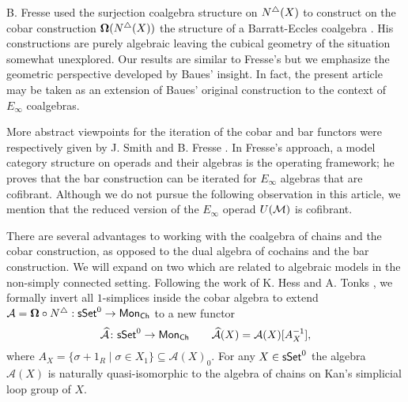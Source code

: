 B. Fresse used the surjection coalgebra structure on $N^{\triangle}(X)$ to construct on the cobar construction $\mathbf{\Omega}(N^{\triangle}(X))$ the  structure of a Barratt-Eccles coalgebra \cite{fresse2003hopf}.
His constructions are purely algebraic leaving the cubical geometry of the situation somewhat unexplored.
Our results are similar to Fresse's but we emphasize the geometric perspective developed by Baues' insight.
In fact, the present article may be taken as an extension of Baues' original construction to the context of $E_{\infty}$ coalgebras.


More abstract viewpoints for the iteration of the cobar and bar functors were respectively given by J. Smith \cite{smith1994cobar} and B. Fresse \cite{fresse2010props}.
In Fresse's approach, a model category structure on operads and their algebras is the operating framework; he proves that the bar construction can be iterated for $E_\infty$ algebras that are cofibrant.
Although we do not pursue the following observation in this article, we mention that the reduced version of the $E_\infty$ operad $U(\mathcal{M})$ is cofibrant.


There are several advantages to working with the coalgebra of chains and the cobar construction, as opposed to the dual algebra of cochains and the bar construction.
We will expand on two which are related to algebraic models in the non-simply connected setting.
Following the work of K. Hess and A. Tonks \cite{hess2010cobar}, we formally invert all $1$-simplices inside the cobar algebra to extend $\mathcal A = \mathbf{\Omega} \circ N^{\triangle}: \mathsf{sSet}^0 \to \mathsf{Mon}_{\mathsf{Ch}}$ to a new functor 
\begin{equation*}
\widehat{\mathcal A} \colon \mathsf{sSet}^0 \to \mathsf{Mon}_{\mathsf{Ch}}
\qquad
\widehat{\mathcal A}( X) = \mathcal A(X)[A_X^{-1}],
\end{equation*}
where $A_X=\{ \sigma +1_R \mid \sigma \in X_1\}\subseteq \mathcal A(X)_0$.
For any $X \in \mathsf{sSet}^0$ the algebra $\widehat{\mathcal A}(X)$ is naturally quasi-isomorphic to the algebra of chains on Kan's simplicial loop group of $X$.

